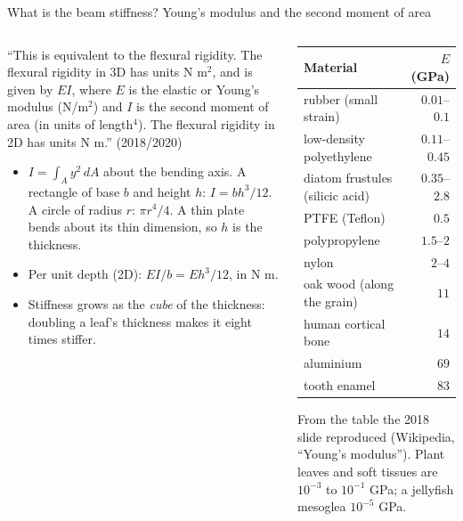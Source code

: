 \documentclass[aspectratio=169,11pt]{beamer}
\begin{document}
\begin{frame}{What is the beam stiffness? Young's modulus and the second moment of area}
\label{fr:ei}
\begin{columns}[T,onlytextwidth]
\begin{column}{0.5\textwidth}
\small ``This is equivalent to the flexural rigidity. The flexural rigidity in 3D has units N m$^2$, and is given by $EI$, where $E$ is the elastic or Young's modulus (N/m$^2$) and $I$ is the second moment of area (in units of length$^4$). The flexural rigidity in 2D has units N m.'' (2018/2020)
\begin{itemize}
  \item $I = \int_A y^2\,dA$ about the bending axis. A rectangle of base $b$ and height $h$: $I = bh^3/12$. A circle of radius $r$: $\pi r^4/4$. A thin plate bends about its thin dimension, so $h$ is the thickness.
  \item Per unit depth (2D): $EI/b = Eh^3/12$, in N m.
  \item Stiffness grows as the \emph{cube} of the thickness: doubling a leaf's thickness makes it eight times stiffer.
\end{itemize}
\end{column}
\begin{column}{0.48\textwidth}
\scriptsize
\begin{tabular}{@{}L{0.52\textwidth}r@{}}
\toprule
Material & $E$ (GPa)\\
\midrule
rubber (small strain) & $0.01$--$0.1$\\
low-density polyethylene & $0.11$--$0.45$\\
diatom frustules (silicic acid) & $0.35$--$2.8$\\
PTFE (Teflon) & $0.5$\\
polypropylene & $1.5$--$2$\\
nylon & $2$--$4$\\
oak wood (along the grain) & $11$\\
human cortical bone & $14$\\
aluminium & $69$\\
tooth enamel & $83$\\
\bottomrule
\end{tabular}

\vspace{1mm}
\scriptsize From the table the 2018 slide reproduced (Wikipedia, ``Young's modulus''). Plant leaves and soft tissues are $10^{-3}$ to $10^{-1}$ GPa; a jellyfish mesoglea $10^{-5}$ GPa.
\end{column}
\end{columns}
\end{frame}
\end{document}

